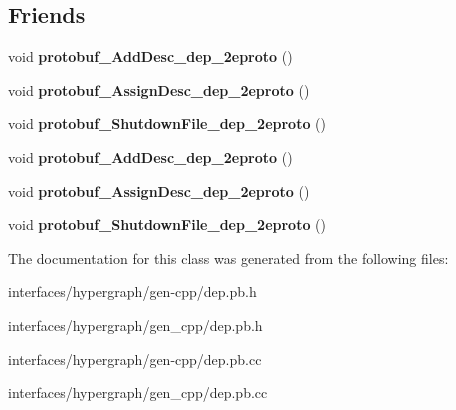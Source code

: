 \subsection*{Friends}
\begin{DoxyCompactItemize}
\item 
\hypertarget{classDep_a2e2e426fb93c4aaa0e5b3d0a15899d92}{
void {\bfseries protobuf\_\-AddDesc\_\-dep\_\-2eproto} ()}
\label{classDep_a2e2e426fb93c4aaa0e5b3d0a15899d92}

\item 
\hypertarget{classDep_ae60899dfa8b3c6020f8e19070804c43b}{
void {\bfseries protobuf\_\-AssignDesc\_\-dep\_\-2eproto} ()}
\label{classDep_ae60899dfa8b3c6020f8e19070804c43b}

\item 
\hypertarget{classDep_aab3c3b65c9043a8a41dcb95f310b49e8}{
void {\bfseries protobuf\_\-ShutdownFile\_\-dep\_\-2eproto} ()}
\label{classDep_aab3c3b65c9043a8a41dcb95f310b49e8}

\item 
\hypertarget{classDep_a2e2e426fb93c4aaa0e5b3d0a15899d92}{
void {\bfseries protobuf\_\-AddDesc\_\-dep\_\-2eproto} ()}
\label{classDep_a2e2e426fb93c4aaa0e5b3d0a15899d92}

\item 
\hypertarget{classDep_ae60899dfa8b3c6020f8e19070804c43b}{
void {\bfseries protobuf\_\-AssignDesc\_\-dep\_\-2eproto} ()}
\label{classDep_ae60899dfa8b3c6020f8e19070804c43b}

\item 
\hypertarget{classDep_aab3c3b65c9043a8a41dcb95f310b49e8}{
void {\bfseries protobuf\_\-ShutdownFile\_\-dep\_\-2eproto} ()}
\label{classDep_aab3c3b65c9043a8a41dcb95f310b49e8}

\end{DoxyCompactItemize}


The documentation for this class was generated from the following files:\begin{DoxyCompactItemize}
\item 
interfaces/hypergraph/gen-\/cpp/dep.pb.h\item 
interfaces/hypergraph/gen\_\-cpp/dep.pb.h\item 
interfaces/hypergraph/gen-\/cpp/dep.pb.cc\item 
interfaces/hypergraph/gen\_\-cpp/dep.pb.cc\end{DoxyCompactItemize}
